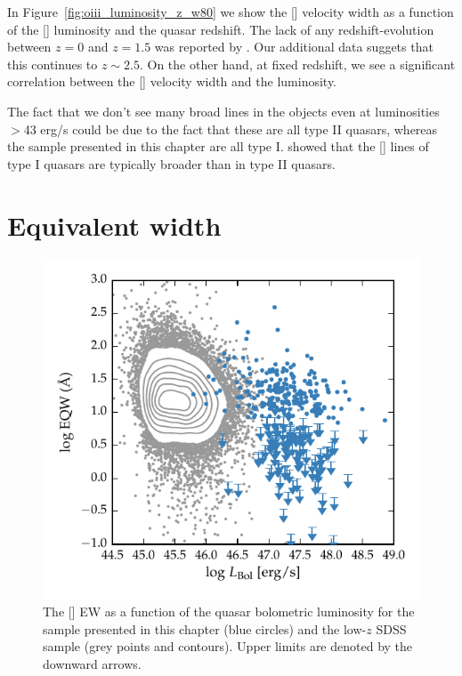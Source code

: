 In Figure~\ref{fig:oiii_luminosity_z_w80} we show the [] velocity width as a function of the [] luminosity and the quasar redshift. 
The lack of any redshift-evolution between $z=0$ and $z=1.5$ was reported by \citet{harrison16}.
Our additional data suggets that this continues to $z\sim2.5$. 
On the other hand, at fixed redshift, we see a significant correlation between the [] velocity width and the luminosity. 

The fact that we don't see many broad lines in the \citet{zakamska14} objects even at luminosities $>$43 erg/s could be due to the fact that these are all type II quasars, whereas the sample presented in this chapter are all type I. 
\citet{mullaney13} showed that the [] lines of type I quasars are typically broader than in type II quasars. 

\section{Equivalent width}

\begin{figure}
    \includegraphics[width=\columnwidth]{figures/chapter04/eqw_lum.pdf} 
    \caption{The [] EW as a function of the quasar bolometric luminosity for the sample presented in this chapter (blue circles) and the low-$z$ SDSS sample (grey points and contours). Upper limits are denoted by the downward arrows.}     
    \label{fig:eqw_lum}
\end{figure}

